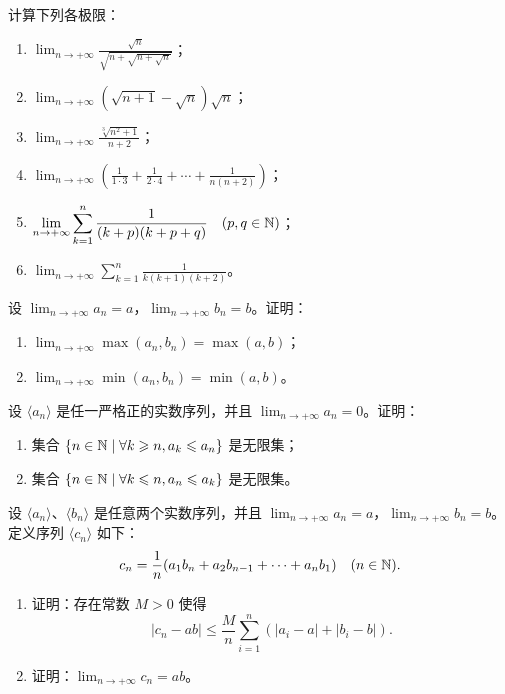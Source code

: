 \begin{exercise}
  \item 计算下列各极限：
  \begin{enumerate}[label=\arabic*)]
    \item \(\displaystyle\lim_{n\to+\infty}\frac{\sqrt n}{\sqrt{n+\sqrt{n+\sqrt n}}}\)；
    \item \(\displaystyle\lim_{n\to+\infty}(\sqrt{n+1}-\sqrt n)\sqrt n\)；
    \item \(\displaystyle\lim_{n\to+\infty}\frac{\sqrt[3]{n^2+1}}{n+2}\)；
    \item \(\displaystyle\lim_{n\to+\infty}\left(\frac1{1\cdot3}+\frac1{2\cdot4}+\cdots+\frac1{n(n+2)}\right)\)；
    \item \(\displaystyle\lim_{n\to+\infty}\sum_{k=1}^{n}\frac1{(k+p)(k+p+q)}\quad(p,q\in\mathbb{N})\)；
    \item \(\displaystyle\lim_{n\to+\infty}\sum_{k=1}^{n}\frac1{k(k+1)(k+2)}\)。
  \end{enumerate}
\end{exercise}

\begin{exercise}
  \item 设 \(\lim_{n\to+\infty}a_n=a\)，\(\lim_{n\to+\infty}b_n=b\)。证明：
  \begin{enumerate}[label=\arabic*)]
    \item \(\displaystyle\lim_{n\to+\infty}\max(a_n,b_n)=\max(a,b)\)；
    \item \(\displaystyle\lim_{n\to+\infty}\min(a_n,b_n)=\min(a,b)\)。
  \end{enumerate}
\end{exercise}

\begin{exercise}
  \item 设 \(\langle a_n\rangle\) 是任一严格正的实数序列，并且
  \(\lim_{n\to+\infty}a_n=0\)。证明：
  \begin{enumerate}[label=\arabic*)]
    \item 集合 \(\{n\in\mathbb{N}\mid \forall k\geqslant n, a_k\leqslant a_n\}\) 是无限集；
    \item 集合 \(\{n\in\mathbb{N}\mid \forall k\leqslant n, a_n\leqslant a_k\}\) 是无限集。
  \end{enumerate}
\end{exercise}

\begin{exercise}
  \item 设 \(\langle a_n\rangle\)、\(\langle b_n\rangle\) 是任意两个实数序列，并且
  \(\lim_{n\to+\infty}a_n=a\)，\(\lim_{n\to+\infty}b_n=b\)。定义序列 \(\langle c_n\rangle\) 如下：
  \[
  c_n=\frac1n(a_1b_n+a_2b_{n-1}+\cdots+a_nb_1)\quad(n\in\mathbb{N}).
  \]
  \begin{enumerate}[label=\arabic*)]
    \item 证明：存在常数 \(M>0\) 使得
    \[
    |c_n-ab|\leqslant\frac Mn\sum_{i=1}^{n}(|a_i-a|+|b_i-b|).
    \]
    \item 证明：\(\displaystyle\lim_{n\to+\infty}c_n=ab\)。
  \end{enumerate}
\end{exercise}

